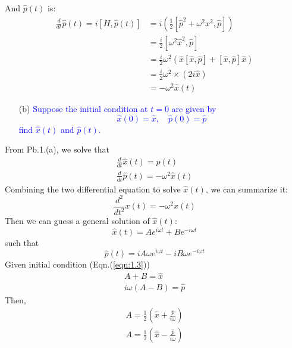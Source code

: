 \documentclass[11pt, a4paper]{article}
\begin{document}
And $\hat{p}(t)$ is:
\begin{align}
    \frac{d}{dt}\hat{p}(t) = i[H, \hat{p}(t)] & = i \left( \frac{1}{2} [\hat{p}^2+\omega^2 x^2, \hat{p}] \right) \\
    & = \frac{i}{2} [\omega^2\hat{x}^2, \hat{p} ] \\
    & = \frac{i}{2} \omega^2 \left( \hat{x}[\hat{x}, \hat{p}] + [\hat{x}, \hat{p}]\hat{x} \right) \\
    & = \frac{i}{2} \omega^2 \times (2i\hat{x}) \\
    & = - \omega^2 \hat{x}(t)
\end{align}
\begin{enumerate}
    \item [(b)] \textcolor{blue}{Suppose the initial condition at $t=0$ are given by 
    \begin{equation}\label{eqn:1.3}
        \hat{x}(0) = \hat{x},\quad \hat{p}(0) = \hat{p}
    \end{equation} find $\hat{x}(t)$ and $\hat{p}(t)$.
    }
\end{enumerate}
From Pb.1.(a), we solve that
\begin{align}
    \frac{d}{dt}\hat{x}(t) = \hat{p}(t) \\
    \frac{d}{dt}\hat{p}(t) = - \omega^2 \hat{x}(t)
\end{align}
Combining the two differential equation to solve $\hat{x}(t)$, we can summarize it:
\begin{equation}
    \frac{d^2}{dt^2} x(t) = - \omega^2x(t)
\end{equation}
Then we can guess a general solution of $\hat{x}(t)$:
\begin{equation}
    \hat{x}(t) = Ae^{i \omega t}+Be^{-i\omega t}
\end{equation}
such that
\begin{equation}
    \hat{p}(t) = i A \omega e^{i \omega t}-i B \omega e^{-i \omega t}
\end{equation}
Given initial condition (Eqn.(\ref{eqn:1.3}))
\begin{align}
    A+B = \hat{x} \\
    i\omega(A - B) = \hat{p}
\end{align}
Then,
\begin{align}
    A = \frac{1}{2}\left( \hat{x} + \frac{\hat{p}}{i\omega} \right)\\
    A = \frac{1}{2}\left( \hat{x} - \frac{\hat{p}}{i\omega} \right)
\end{align}
\end{document}
